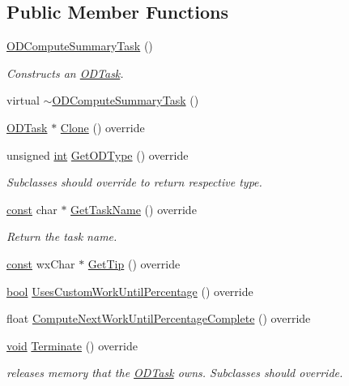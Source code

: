 \subsection*{Public Member Functions}
\begin{DoxyCompactItemize}
\item 
\hyperlink{class_o_d_compute_summary_task_aea49b78ebf61d1278bb24317055b49c2}{O\+D\+Compute\+Summary\+Task} ()
\begin{DoxyCompactList}\small\item\em Constructs an \hyperlink{class_o_d_task}{O\+D\+Task}. \end{DoxyCompactList}\item 
virtual \hyperlink{class_o_d_compute_summary_task_a64247efe84f7cac3999f85eb0dd86659}{$\sim$\+O\+D\+Compute\+Summary\+Task} ()
\item 
\hyperlink{class_o_d_task}{O\+D\+Task} $\ast$ \hyperlink{class_o_d_compute_summary_task_a54dbb1599de0deb41d88b3136680b279}{Clone} () override
\item 
unsigned \hyperlink{xmltok_8h_a5a0d4a5641ce434f1d23533f2b2e6653}{int} \hyperlink{class_o_d_compute_summary_task_a489e87f4ce98b9e4a7f4ee576d2dcb8d}{Get\+O\+D\+Type} () override
\begin{DoxyCompactList}\small\item\em Subclasses should override to return respective type. \end{DoxyCompactList}\item 
\hyperlink{getopt1_8c_a2c212835823e3c54a8ab6d95c652660e}{const} char $\ast$ \hyperlink{class_o_d_compute_summary_task_a1d39f1318b0b22313dc1eff4c5088f0e}{Get\+Task\+Name} () override
\begin{DoxyCompactList}\small\item\em Return the task name. \end{DoxyCompactList}\item 
\hyperlink{getopt1_8c_a2c212835823e3c54a8ab6d95c652660e}{const} wx\+Char $\ast$ \hyperlink{class_o_d_compute_summary_task_a7391309c4b4b9d22c169a9876a28bc9a}{Get\+Tip} () override
\item 
\hyperlink{mac_2config_2i386_2lib-src_2libsoxr_2soxr-config_8h_abb452686968e48b67397da5f97445f5b}{bool} \hyperlink{class_o_d_compute_summary_task_ad9edad0b190d9399579ee6cfe0067562}{Uses\+Custom\+Work\+Until\+Percentage} () override
\item 
float \hyperlink{class_o_d_compute_summary_task_a546eb6fc22657346e92daa64602cdf4e}{Compute\+Next\+Work\+Until\+Percentage\+Complete} () override
\item 
\hyperlink{sound_8c_ae35f5844602719cf66324f4de2a658b3}{void} \hyperlink{class_o_d_compute_summary_task_a86f4bf81bd99c3cec23eee5352424ad3}{Terminate} () override
\begin{DoxyCompactList}\small\item\em releases memory that the \hyperlink{class_o_d_task}{O\+D\+Task} owns. Subclasses should override. \end{DoxyCompactList}\end{DoxyCompactItemize}
